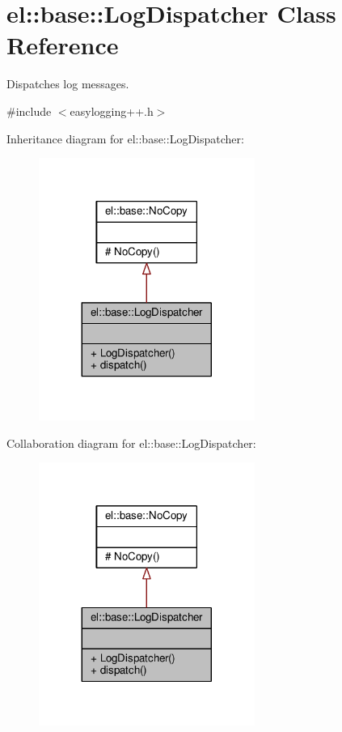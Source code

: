 \hypertarget{classel_1_1base_1_1LogDispatcher}{}\section{el\+:\+:base\+:\+:Log\+Dispatcher Class Reference}
\label{classel_1_1base_1_1LogDispatcher}


Dispatches log messages.  




{\ttfamily \#include $<$easylogging++.\+h$>$}



Inheritance diagram for el\+:\+:base\+:\+:Log\+Dispatcher\+:
\nopagebreak
\begin{figure}[H]
\begin{center}
\leavevmode
\includegraphics[width=200pt]{d7/d9e/classel_1_1base_1_1LogDispatcher__inherit__graph}
\end{center}
\end{figure}


Collaboration diagram for el\+:\+:base\+:\+:Log\+Dispatcher\+:
\nopagebreak
\begin{figure}[H]
\begin{center}
\leavevmode
\includegraphics[width=200pt]{df/d76/classel_1_1base_1_1LogDispatcher__coll__graph}
\end{center}
\end{figure}
